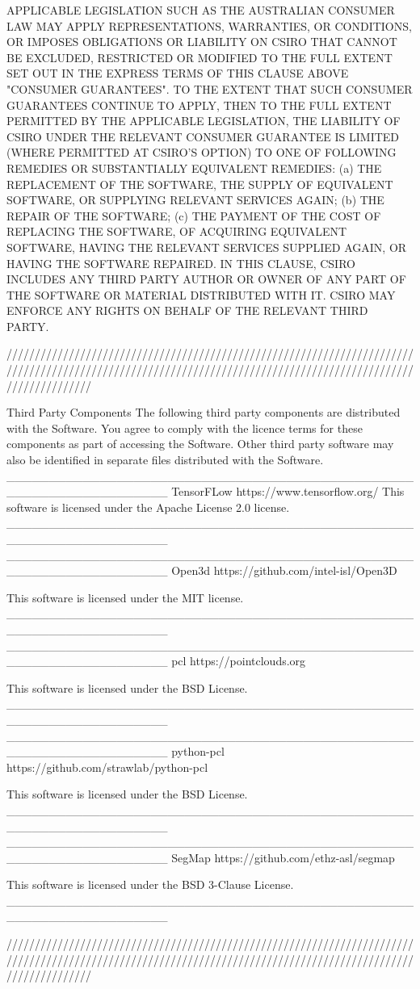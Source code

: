 APPLICABLE LEGISLATION SUCH AS THE AUSTRALIAN CONSUMER LAW MAY APPLY REPRESENTATIONS, WARRANTIES, OR CONDITIONS, OR IMPOSES OBLIGATIONS OR LIABILITY ON CSIRO THAT CANNOT BE EXCLUDED, RESTRICTED OR MODIFIED TO THE FULL EXTENT SET OUT IN THE EXPRESS TERMS OF THIS CLAUSE ABOVE "CONSUMER GUARANTEES".  TO THE EXTENT THAT SUCH CONSUMER GUARANTEES CONTINUE TO APPLY, THEN TO THE FULL EXTENT PERMITTED BY THE APPLICABLE LEGISLATION, THE LIABILITY OF CSIRO UNDER THE RELEVANT CONSUMER GUARANTEE IS LIMITED (WHERE PERMITTED AT CSIRO’S OPTION) TO ONE OF FOLLOWING REMEDIES OR SUBSTANTIALLY EQUIVALENT REMEDIES:
(a)               THE REPLACEMENT OF THE SOFTWARE, THE SUPPLY OF EQUIVALENT SOFTWARE, OR SUPPLYING RELEVANT SERVICES AGAIN;
(b)               THE REPAIR OF THE SOFTWARE;
(c)               THE PAYMENT OF THE COST OF REPLACING THE SOFTWARE, OF ACQUIRING EQUIVALENT SOFTWARE, HAVING THE RELEVANT SERVICES SUPPLIED AGAIN, OR HAVING THE SOFTWARE REPAIRED.
IN THIS CLAUSE, CSIRO INCLUDES ANY THIRD PARTY AUTHOR OR OWNER OF ANY PART OF THE SOFTWARE OR MATERIAL DISTRIBUTED WITH IT.  CSIRO MAY ENFORCE ANY RIGHTS ON BEHALF OF THE RELEVANT THIRD PARTY.

///////////////////////////////////////////////////////////////////////////////////////////////////////////////////////////////////////////////////////////////

Third Party Components
The following third party components are distributed with the Software.  You agree to comply with the licence terms for these components as part of accessing the Software.  Other third party software may also be identified in separate files distributed with the Software.
___________________________________________________________________
TensorFLow  https://www.tensorflow.org/
This software is licensed under the Apache License 2.0 license.
___________________________________________________________________
___________________________________________________________________
Open3d https://github.com/intel-isl/Open3D

This software is licensed under the MIT license.
___________________________________________________________________
___________________________________________________________________
pcl https://pointclouds.org

This software is licensed under the BSD License.
___________________________________________________________________
___________________________________________________________________
python-pcl https://github.com/strawlab/python-pcl

This software is licensed under the BSD License.
___________________________________________________________________
___________________________________________________________________
SegMap https://github.com/ethz-asl/segmap

This software is licensed under the BSD 3-Clause License.
___________________________________________________________________
  
  
///////////////////////////////////////////////////////////////////////////////////////////////////////////////////////////////////////////////////////////////



